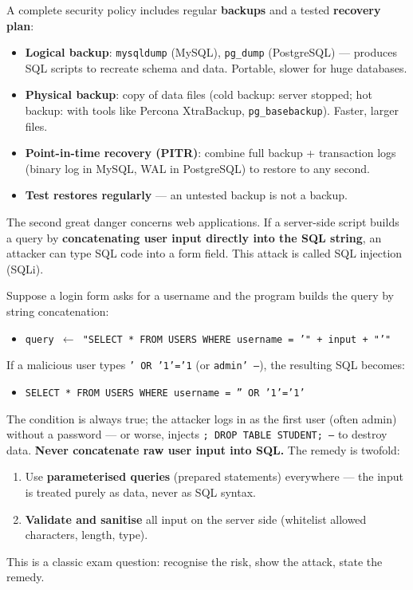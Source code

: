 \documentclass[11pt]{article}
\newcommand{\cle}[1]{{\popxbold\color{popdark}#1}}
\begin{document}
\begin{propriete}
A complete security policy includes regular \textbf{backups} and a tested \textbf{recovery plan}:
\begin{itemize}
\item \textbf{Logical backup}: \texttt{mysqldump} (MySQL), \texttt{pg\_dump} (PostgreSQL) — produces SQL scripts to recreate schema and data. Portable, slower for huge databases.
\item \textbf{Physical backup}: copy of data files (cold backup: server stopped; hot backup: with tools like Percona XtraBackup, \texttt{pg\_basebackup}). Faster, larger files.
\item \textbf{Point-in-time recovery (PITR)}: combine full backup + transaction logs (binary log in MySQL, WAL in PostgreSQL) to restore to any second.
\item \textbf{Test restores regularly} — an untested backup is not a backup.
\end{itemize}
\end{propriete}

The second great danger concerns web applications. If a server-side script builds a query by \textbf{concatenating user input directly into the SQL string}, an attacker can type SQL code into a form field. This attack is called \cle{SQL injection} (SQLi).

\begin{attention}
Suppose a login form asks for a username and the program builds the query by string concatenation:
\begin{itemize}
\item \texttt{query $\leftarrow$ "SELECT * FROM USERS WHERE username = '" + input + "'"}
\end{itemize}
If a malicious user types \texttt{' OR '1'='1} (or \texttt{admin' --}), the resulting SQL becomes:
\begin{itemize}
\item \texttt{SELECT * FROM USERS WHERE username = '' OR '1'='1'}
\end{itemize}
The condition is always true; the attacker logs in as the first user (often admin) without a password — or worse, injects \texttt{; DROP TABLE STUDENT; --} to destroy data. \textbf{Never concatenate raw user input into SQL.} The remedy is twofold:
\begin{enumerate}
\item Use \textbf{parameterised queries} (prepared statements) everywhere — the input is treated purely as data, never as SQL syntax.
\item \textbf{Validate and sanitise} all input on the server side (whitelist allowed characters, length, type).
\end{enumerate}
This is a classic exam question: recognise the risk, show the attack, state the remedy.
\end{attention}
\end{document}
